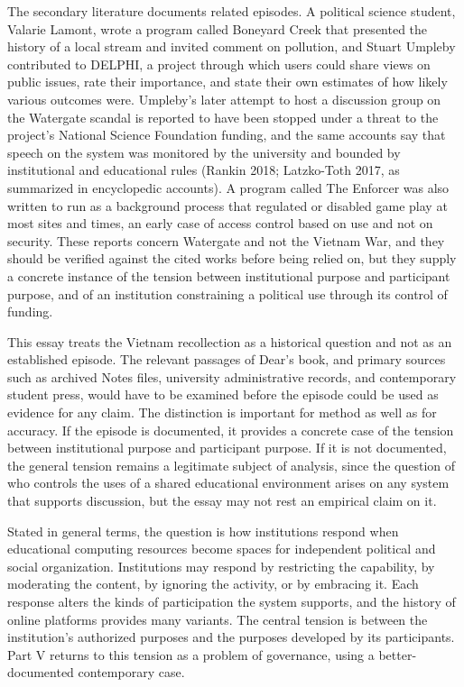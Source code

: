 \documentclass[11pt]{article}
\theoremstyle{remark}
\begin{document}
The secondary literature documents related episodes. A political science student, Valarie Lamont, wrote a program called Boneyard Creek that presented the history of a local stream and invited comment on pollution, and Stuart Umpleby contributed to DELPHI, a project through which users could share views on public issues, rate their importance, and state their own estimates of how likely various outcomes were. Umpleby's later attempt to host a discussion group on the Watergate scandal is reported to have been stopped under a threat to the project's National Science Foundation funding, and the same accounts say that speech on the system was monitored by the university and bounded by institutional and educational rules (Rankin 2018; Latzko-Toth 2017, as summarized in encyclopedic accounts). A program called The Enforcer was also written to run as a background process that regulated or disabled game play at most sites and times, an early case of access control based on use and not on security. These reports concern Watergate and not the Vietnam War, and they should be verified against the cited works before being relied on, but they supply a concrete instance of the tension between institutional purpose and participant purpose, and of an institution constraining a political use through its control of funding.

This essay treats the Vietnam recollection as a historical question and not as an established episode. The relevant passages of Dear's book, and primary sources such as archived Notes files, university administrative records, and contemporary student press, would have to be examined before the episode could be used as evidence for any claim. The distinction is important for method as well as for accuracy. If the episode is documented, it provides a concrete case of the tension between institutional purpose and participant purpose. If it is not documented, the general tension remains a legitimate subject of analysis, since the question of who controls the uses of a shared educational environment arises on any system that supports discussion, but the essay may not rest an empirical claim on it.

Stated in general terms, the question is how institutions respond when educational computing resources become spaces for independent political and social organization. Institutions may respond by restricting the capability, by moderating the content, by ignoring the activity, or by embracing it. Each response alters the kinds of participation the system supports, and the history of online platforms provides many variants. The central tension is between the institution's authorized purposes and the purposes developed by its participants. Part V returns to this tension as a problem of governance, using a better-documented contemporary case.
\end{document}
